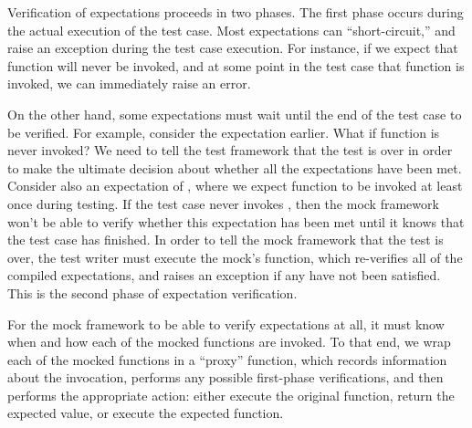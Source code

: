 Verification of expectations proceeds in two phases. The first phase
occurs during the actual execution of the test case. Most expectations
can ``short-circuit,'' and raise an  exception
during the test case execution. For instance, if we expect that
function  will never be invoked, and at some point in the test
case that function is invoked, we can immediately raise an error.

On the other hand, some expectations must wait until the end of the
test case to be verified. For example, consider the 
expectation earlier. What if function  is never invoked? We
need to tell the test framework that the test is over in order to make
the ultimate decision about whether all the expectations have been
met. Consider also an expectation of , where we expect
function  to be invoked at least once during testing. If the
test case never invokes , then the mock framework won't be
able to verify whether this expectation has been met until it knows
that the test case has finished. In order to tell the mock framework
that the test is over, the test writer must execute the mock's
 function, which re-verifies all of the compiled
expectations, and raises an  exception if any
have not been satisfied. This is the second phase of expectation
verification.

For the mock framework to be able to verify expectations at all, it
must know when and how each of the mocked functions are invoked. To
that end, we wrap each of the mocked functions in a ``proxy''
function, which records information about the invocation, performs any
possible first-phase verifications, and then performs the appropriate
action: either execute the original function, return the expected
value, or execute the expected function.

